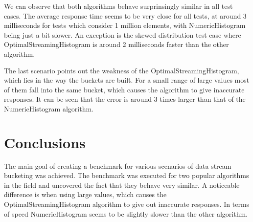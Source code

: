 \documentclass[12pt]{article}
\begin{document}
	We can observe that both algorithms behave surprinsingly similar in all test cases. 
	The average response time seems to be very close for all tests, at around 3 milliseconds for 
	tests which consider 1 million elements, with NumericHistogram being just a bit slower.	
	An exception is the skewed distribution test case where OptimalStreamingHistogram is 
	around 2 milliseconds faster than the other algorithm.
	
	The last scenario points out the weakness of the OptimalStreamingHistogram,
	which lies in the way the buckets are built. For a small range of large 
	values most of them fall into the same bucket, which causes the algorithm 
	to give inaccurate responses. It can be seen that the error is around 3 
	times larger than that of the NumericHistogram algorithm.

	\section{Conclusions}
	The main goal of creating a benchmark for various scenarios of data stream 
	bucketing was achieved. The benchmark was executed for two popular algorithms 
	in the field and uncovered the fact that they behave very similar. A noticeable 
	difference is when using large values, which causes the OptimalStreamingHistogram algorithm 
	to give out inaccurate responses. In terms of speed NumericHistogram seems to 
	be slightly slower than the other algorithm.

	\newpage
	
	
\end{document}
